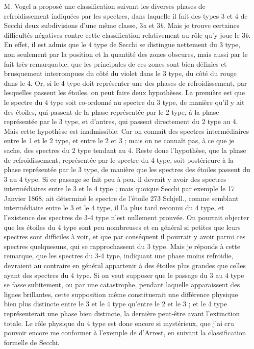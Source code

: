 \documentclass[a4paper, 12pt, oneside, polutonikogreek, english]{article}
\begin{document}
M. Vogel a proposé une classification suivant les diverses phases de refroidissement indiquées par les spectres, dans laquelle il fait des types 3 et 4 de Secchi deux subdivisions d'une même classe, 3\emph{a} et 3\emph{b}. Mais je trouve certaines difficultés négatives contre cette classification relativement au rôle qu'y joue le 3\emph{b}. En effet, il est admis que le 4 type de Secchi se distingue nettement du 3 type, non seulement par la position et la quantité des zones obscures, mais aussi par le fait très-remarquable, que les principales de ces zones sont bien définies et brusquement interrompues du côté du violet dans le 3 type, du côté du rouge dans le 4. Or, si le 4 type doit représenter une des phases de refroidissement, par lesquelles passent les étoiles, on peut faire deux hypothèses. La première est que le spectre du 4 type soit co-ordonné au spectre du 3 type, de manière qu'il y ait des étoiles, qui passent de la phase représentée par le 2 type, à la phase représentée par le 3 type, et d'autres, qui passent directement du 2 type au 4. Mais cette hypothèse est inadmissible. Car on connaît des spectres intermédiaires entre le 1 et le 2 type, et entre le 2 et 3 ; mais on ne connaît pas, à ce que je sache, des spectres du 2 type tendant au 4. Reste done l'hypothèse, que la phase de refroidissement, représentée par le spectre du 4 type, soit postérieure à la phase représentée par le 3 type, de manière que les spectres des étoiles passent du 3 au 4 type. Si ce passage se fait peu à peu, il devrait y avoir des spectres intermédiaires entre le 3 et le 4 type ; mais quoique Secchi par exemple le 17 Janvier 1868, ait déterminé le spectre de l'étoile 273 Schjell., comme semblant intermédiaire entre le 3 et le 4 type, il l'a plus tard reconnu du 4 type, et l'existence des spectres de 3-4 type n'est nullement prouvée. On pourrait objecter que les étoiles du 4 type sont peu nombreuses et en général si petites que leurs spectres sont difficiles à voir, et que par conséquent il pourrait y avoir parmi ces spectres quelquesuns, qui se rapprochassent du 3 type. Mais je réponds à cette remarque, que les spectres du 3-4 type, indiquant une phase moins refroidie, devraient au contraire en général appartenir à des étoiles plus grandes que celles ayant des spectres du 4 type. Si on veut supposer que le passage du 3 au 4 type se fasse subitement, ou par une catastrophe, pendant laquelle apparaissent des lignes brillantes, cette supposition même constituerait une différence physique bien plus distincte entre le 3 et le 4 type qu'entre le 2 et le 3 ; et le 4 type représenterait une phase bien distincte, la dernière peut-être avant l'extinction totale. Le rôle physique du 4 type est done encore si mystérieux, que j'ai cru pouvoir encore me conformer à l'exemple de d'Arrest, en suivant la classification formelle de Secchi.
\end{document}
